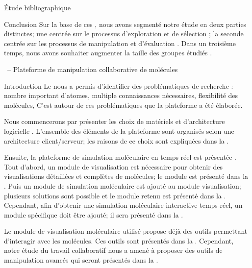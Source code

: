 \documentclass[myfrancais,ngerman,english,french]{mythesis}
\begin{document}
\begin{mychapter}{Étude bibliographique}
\begin{mysection}{Conclusion}
			Sur la base de ces , nous avons segmenté notre étude en deux parties distinctes; une centrée sur le processus d'exploration et de sélection ; la seconde centrée sur les processus de manipulation et d'évaluation .
			Dans un troisième temps, nous avons souhaiter augmenter la taille des groupes étudiés .
		\end{mysection}
	\end{mychapter}
	\begin{mychapter}{\myShaddock\ -- Plateforme de manipulation collaborative de molécules}
		\begin{mysection}{Introduction}
			Le  nous a permis d'identifier des problématiques de recherche : nombre important d'atomes, multiple connaissances nécessaires, flexibilité des molécules, \myetc
			C'est autour de ces problématiques que la plateforme \myShaddock a été élaborée.

			Nous commencerons par présenter les choix de matériels et d'architecture logicielle .
			L'ensemble des éléments de la plateforme sont organisés selon une architecture client/serveur; les raisons de ce choix sont expliquées dans la .

			Ensuite, la plateforme de simulation moléculaire en temps-réel est présentée .
			Tout d'abord, un module de visualisation est nécessaire pour obtenir des visualisations détaillées et complètes de molécules; le module est présenté dans la .
			Puis un module de simulation moléculaire est ajouté au module visualisation; plusieurs solutions sont possible et le module retenu est présenté dans la .
			Cependant, afin d'obtenir une simulation moléculaire interactive temps-réel, un module spécifique doit être ajouté; il sera présenté dans la .

			Le module de visualisation moléculaire utilisé propose déjà des outils permettant d'interagir avec les molécules.
			Ces outils sont présentés dans la .
			Cependant, notre étude du travail collaboratif nous a amené à proposer des outils de manipulation avancés qui seront présentés dans la .


\end{mysection}
\end{mychapter}
\end{document}
